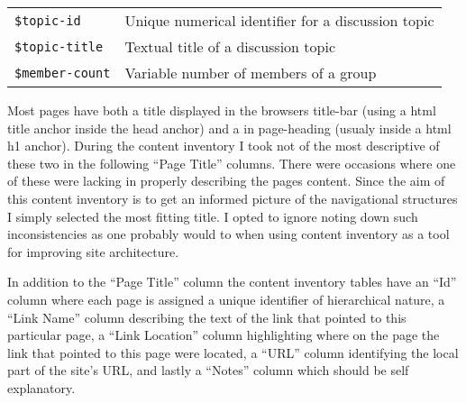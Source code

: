 \documentclass[11pt,a4paper]{article}
\newcommand{\var}[1]{\texttt{\${#1}}}
\begin{document}
\begin{table}[h!b!p!]
\begin{center}
\begin{small}
\begin{tabular}{lp{8cm}}
      \var{topic-id} &
      Unique numerical identifier for a discussion topic \\

      \var{topic-title} &
      Textual title of a discussion topic \\

      \var{member-count} &
      Variable number of members of a group \\

      \bottomrule

    \end{tabular}
  \end{small}
  \end{center}
\end{table}

Most pages have both a title displayed in the browsers title-bar (using a
html title anchor inside the head anchor) and a in page-heading (usualy inside
a html h1 anchor). During the content inventory I took not of the most
descriptive of these two in the following ``Page Title'' columns. There were
occasions where one of these were lacking in properly describing the pages
content. Since the aim of this content inventory is to get an informed picture
of the navigational structures I simply selected the most fitting title.
I opted to ignore noting down such inconsistencies as one probably would to
when using content inventory as a tool for improving site architecture.

In addition to the ``Page Title'' column the content inventory tables have an
``Id'' column where each page is assigned a unique identifier of hierarchical
nature, a ``Link Name'' column describing the text of the link that pointed to
this particular page, a ``Link Location'' column highlighting where on the
page the link that pointed to this page were located, a ``URL'' column
identifying the local part of the site's URL, and lastly a ``Notes'' column
which should be self explanatory.
\end{document}
